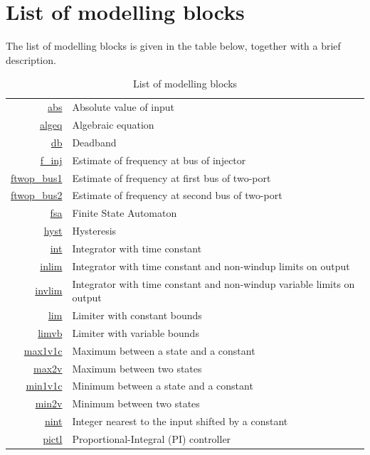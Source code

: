 \section{List of modelling blocks}

The list of modelling blocks is given in the table below, together with a brief description.

\begin{table}[h!]
\centering
\caption{List of modelling blocks}
\begin{tabular}{|rl|} \hline
\hyperlink{link_to_abs}{abs} & Absolute value of input \\
\hyperlink{link_to_algeq}{algeq} & Algebraic equation \\
\hyperlink{link_to_db}{db}& Deadband \\
\hyperlink{link_to_finj}{f\_inj} & Estimate of frequency at bus of injector \\
\hyperlink{link_to_ftwop1}{ftwop\_bus1} & Estimate of frequency at first bus of two-port \\
\hyperlink{link_to_ftwop2}{ftwop\_bus2} & Estimate of frequency at second bus of two-port \\
\hyperlink{link_to_fsa}{fsa} & Finite State Automaton \\
\hyperlink{link_to_hyst}{hyst} & Hysteresis \\
\hyperlink{link_to_int}{int} & Integrator with time constant \\
\hyperlink{link_to_inlim}{inlim} & Integrator with time constant and non-windup limits on output \\
\hyperlink{link_to_invlim}{invlim} & Integrator with time constant and non-windup variable limits on output \\
\hyperlink{link_to_lim}{lim} & Limiter with constant bounds \\
\hyperlink{link_to_limvb}{limvb} & Limiter with variable bounds \\
\hyperlink{link_to_max1v1c}{max1v1c} & Maximum between a state and a constant \\ 
\hyperlink{link_to_max2v}{max2v} & Maximum between two states \\
\hyperlink{link_to_min1v1c}{min1v1c} & Minimum between a state and a constant  \\
\hyperlink{link_to_min2v}{min2v} & Minimum between two states \\
\hyperlink{link_to_nint}{nint} & Integer nearest to the input shifted by a constant \\
\hyperlink{link_to_pictl}{pictl} & Proportional-Integral (PI) controller \\

\end{tabular}
\end{table}
